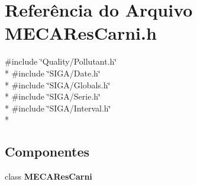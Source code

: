 \section{Referência do Arquivo M\+E\+C\+A\+Res\+Carni.\+h}
\label{_m_e_c_a_res_carni_8h}
{\ttfamily \#include \char`\"{}Quality/\+Pollutant.\+h\char`\"{}}\\*
{\ttfamily \#include \char`\"{}S\+I\+G\+A/\+Date.\+h\char`\"{}}\\*
{\ttfamily \#include \char`\"{}S\+I\+G\+A/\+Globals.\+h\char`\"{}}\\*
{\ttfamily \#include \char`\"{}S\+I\+G\+A/\+Serie.\+h\char`\"{}}\\*
{\ttfamily \#include \char`\"{}S\+I\+G\+A/\+Interval.\+h\char`\"{}}\\*
\subsection*{Componentes}
\begin{DoxyCompactItemize}
\item 
class {\bf M\+E\+C\+A\+Res\+Carni}
\end{DoxyCompactItemize}
